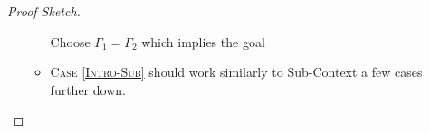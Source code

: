\documentclass[twoside, english]{sdqthesis}
\newcommand{\bbracket}[1]{\llbracket #1 \rrbracket}
\newcommand{\tr}[0]{\triangleright}
\theoremstyle{definition}
\begin{document}
\begin{proof}[Proof Sketch]
\begin{itemize}
\begin{itemize}
        Choose $\Gamma_1 = \Gamma_2$ which implies the goal
      \item \textsc{Case \cref{Intro-Sub}} should work similarly to Sub-Context a few cases further down.

    \end{itemize} 
    





\end{itemize}
\end{proof}
\end{document}
